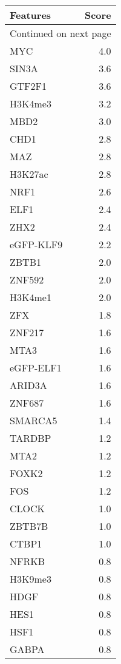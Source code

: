 \begin{longtable}{lr}
\caption{}\\
\toprule
   Features &  Score \\
\midrule
\endhead
\midrule
\multicolumn{2}{r}{{Continued on next page}} \\
\midrule
\endfoot

\bottomrule
\endlastfoot
        MYC &    4.0 \\
      SIN3A &    3.6 \\
     GTF2F1 &    3.6 \\
    H3K4me3 &    3.2 \\
       MBD2 &    3.0 \\
       CHD1 &    2.8 \\
        MAZ &    2.8 \\
    H3K27ac &    2.8 \\
       NRF1 &    2.6 \\
       ELF1 &    2.4 \\
       ZHX2 &    2.4 \\
  eGFP-KLF9 &    2.2 \\
      ZBTB1 &    2.0 \\
     ZNF592 &    2.0 \\
    H3K4me1 &    2.0 \\
        ZFX &    1.8 \\
     ZNF217 &    1.6 \\
       MTA3 &    1.6 \\
  eGFP-ELF1 &    1.6 \\
     ARID3A &    1.6 \\
     ZNF687 &    1.6 \\
    SMARCA5 &    1.4 \\
     TARDBP &    1.2 \\
       MTA2 &    1.2 \\
      FOXK2 &    1.2 \\
        FOS &    1.2 \\
      CLOCK &    1.0 \\
     ZBTB7B &    1.0 \\
      CTBP1 &    1.0 \\
      NFRKB &    0.8 \\
    H3K9me3 &    0.8 \\
       HDGF &    0.8 \\
       HES1 &    0.8 \\
       HSF1 &    0.8 \\
      GABPA &    0.8 \\

\end{longtable}
